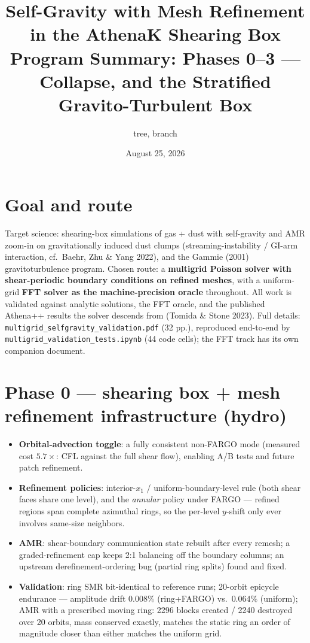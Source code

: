 \documentclass[11pt]{article}
\title{Self-Gravity with Mesh Refinement in the AthenaK Shearing Box\\
       \large Program Summary: Phases 0--3 --- Collapse, and the Stratified
       Gravito-Turbulent Box}
\author{\code{athenak-multigrid} tree, branch \code{multigrid}}
\date{August 25, 2026}
\newcommand{\code}[1]{\texttt{#1}}
\begin{document}
\maketitle

\section*{Goal and route}
Target science: shearing-box simulations of gas + dust with self-gravity and
AMR zoom-in on gravitationally induced dust clumps (streaming-instability /
GI-arm interaction, cf.\ Baehr, Zhu \& Yang 2022), and the Gammie (2001)
gravitoturbulence program. Chosen route: a \textbf{multigrid Poisson solver
with shear-periodic boundary conditions on refined meshes}, with a
uniform-grid \textbf{FFT solver as the machine-precision oracle} throughout.
All work is validated against analytic solutions, the FFT oracle, and the
published Athena++ results the solver descends from (Tomida \& Stone 2023).
Full details: \code{multigrid\_selfgravity\_validation.pdf} (32 pp.),
reproduced end-to-end by \code{multigrid\_validation\_tests.ipynb} (44 code
cells); the FFT track has its own companion document.

\section*{Phase 0 --- shearing box + mesh refinement infrastructure (hydro)}
\begin{itemize}\itemsep2pt
  \item \textbf{Orbital-advection toggle}: a fully consistent non-FARGO mode
        (measured cost $5.7\times$: CFL against the full shear flow), enabling
        A/B tests and future patch refinement.
  \item \textbf{Refinement policies}: interior-$x_1$ / uniform-boundary-level
        rule (both shear faces share one level), and the \emph{annular} policy
        under FARGO --- refined regions span complete azimuthal rings, so the
        per-level $y$-shift only ever involves same-size neighbors.
  \item \textbf{AMR}: shear-boundary communication state rebuilt after every
        remesh; a graded-refinement cap keeps 2:1 balancing off the boundary
        columns; an upstream derefinement-ordering bug (partial ring splits)
        found and fixed.
  \item \textbf{Validation}: ring SMR bit-identical to reference runs; 20-orbit
        epicycle endurance --- amplitude drift $0.008\%$ (ring+FARGO) vs.\
        $0.064\%$ (uniform); AMR with a prescribed moving ring: 2296 blocks
        created / 2240 destroyed over 20 orbits, mass conserved exactly,
        matches the static ring an order of magnitude closer than either
        matches the uniform grid.
\end{itemize}
\end{document}
